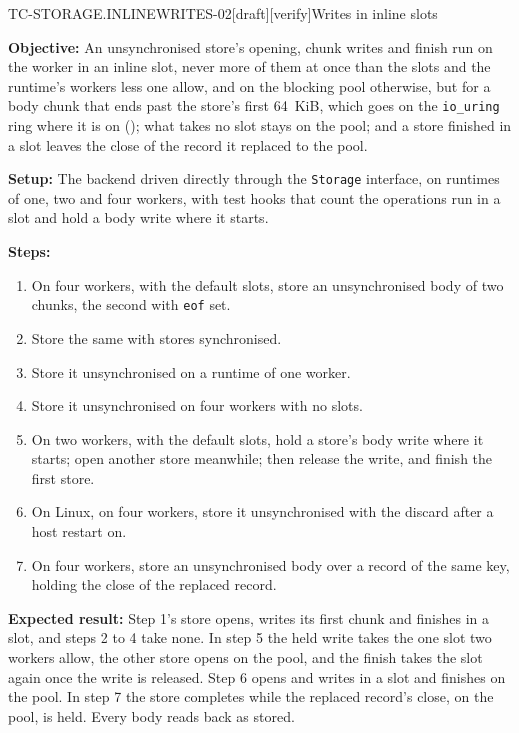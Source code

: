 \begin{requirement}{TC-STORAGE.INLINEWRITES-02}[draft][verify]{Writes in inline slots}


  \textbf{Objective:} An unsynchronised store's opening, chunk writes and
  finish run on the worker in an inline slot, never more of them at once
  than the slots and the runtime's workers less one allow, and on the
  blocking pool otherwise, but for a body chunk that ends past the store's
  first 64~KiB, which goes on the \texttt{io\_uring} ring where it is on
  (); what takes no slot stays on the pool;
  and a store finished in a slot leaves the close of the record it replaced
  to the pool.

  \textbf{Setup:} The backend driven directly through the \texttt{Storage}
  interface, on runtimes of one, two and four workers, with test hooks that
  count the operations run in a slot and hold a body write where it starts.

  \textbf{Steps:}
  \begin{enumerate}
    \item On four workers, with the default slots, store an unsynchronised
      body of two chunks, the second with \texttt{eof} set.
    \item Store the same with stores synchronised.
    \item Store it unsynchronised on a runtime of one worker.
    \item Store it unsynchronised on four workers with no slots.
    \item On two workers, with the default slots, hold a store's body write
      where it starts; open another store meanwhile; then release the write,
      and finish the first store.
    \item On Linux, on four workers, store it unsynchronised with the
      discard after a host restart on.
    \item On four workers, store an unsynchronised body over a record of the
      same key, holding the close of the replaced record.
  \end{enumerate}

  \textbf{Expected result:} Step 1's store opens, writes its first chunk
  and finishes in a slot, and steps 2 to 4 take none. In step 5 the held
  write takes the one slot two workers allow, the other store opens on the
  pool, and the finish takes the slot again once the write is released.
  Step 6 opens and writes in a slot and finishes on the pool. In step 7 the
  store completes while the replaced record's close, on the pool, is held.
  Every body reads back as stored.



\end{requirement}

